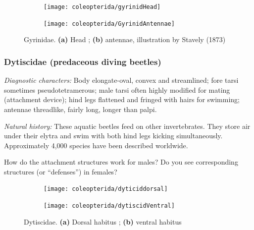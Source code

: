 \begin{figure}[ht!]
  \centering
\begin{subfigure}[ht!]{0.3\textwidth}
    \texttt{[image: coleopterida/gyrinidHead]}
  \caption{}
  \label{fig:gyrinidhead}
\end{subfigure}
    \hfill
\begin{subfigure}[ht!]{0.3\textwidth}
    \texttt{[image: coleopterida/GyrinidAntennae]}
  \caption{}
  \label{fig:gyrinidantenna}
\end{subfigure}
    \caption{Gyrinidae. \textbf{(a)} Head \citep[][Fig. 13:23]{bhlitem126080aquatic}; \textbf{(b)} antennae, illustration by Stavely (1873)}\label{fig:gyrinids}
\end{figure}

\subsubsection{Dytiscidae (predaceous diving beetles)}
\noindent{}\textit{Diagnostic characters:} Body elongate-oval, convex and streamlined; fore tarsi sometimes pseudotetramerous; male tarsi often highly modified for mating (attachment device); hind legs flattened and fringed with hairs for swimming; antennae threadlike, fairly long, longer than palpi.\vspace{3mm}

\noindent{}\textit{Natural history:} These aquatic beetles feed on other invertebrates. They store air under their elytra and swim with both hind legs kicking simultaneously. Approximately 4,000 species have been described worldwide.\vspace{3mm}

\begin{theo}
{}How do the attachment structures work for males? Do you see corresponding structures (or ``defenses'') in females?
\end{theo}

\begin{figure}[ht!]
  \centering
\begin{subfigure}[ht!]{0.4\textwidth}
    \texttt{[image: coleopterida/dyticiddorsal]}
  \caption{}
  \label{fig:dytiscidHabitus1}
\end{subfigure}
    \hfill
\begin{subfigure}[ht!]{0.45\textwidth}
    \texttt{[image: coleopterida/dytiscidVentral]}
  \caption{}
  \label{fig:dytiscidHabitus2}
\end{subfigure}
    \caption{Dytiscidae. \textbf{(a)} Dorsal habitus \citep[][Fig. 96B]{bhlitem56570}; \textbf{(b)} ventral habitus \citep[Modified from Fig. 13:9 in][]{bhlitem126080aquatic}}\label{fig:dytiscids}
\end{figure}


